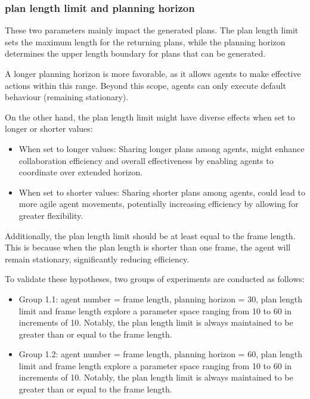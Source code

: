 \subsubsection{plan length limit and planning horizon}

These two parameters mainly impact the generated plans. The plan length limit sets the maximum length for the returning plans, while the planning horizon determines the upper length boundary for plans that can be generated.

A longer planning horizon is more favorable, as it allows agents to make effective actions within this range. Beyond this scope, agents can only execute default behaviour (remaining stationary).

On the other hand, the plan length limit might have diverse effects when set to longer or shorter values:
\begin{itemize}
    \item When set to longer values: Sharing longer plans among agents, might enhance collaboration efficiency and overall effectiveness by enabling agents to coordinate over extended horizon.
    \item When set to shorter values: Sharing shorter plans among agents, could lead to more agile agent movements, potentially increasing efficiency by allowing for greater flexibility.
\end{itemize}

Additionally, the plan length limit should be at least equal to the frame length. This is because when the plan length is shorter than one frame, the agent will remain stationary, significantly reducing efficiency.

To validate these hypotheses, two groups of experiments are conducted as follows:
\begin{itemize}
    \item Group 1.1: agent number = frame length, planning horizon = 30, plan length limit and frame length explore a parameter space ranging from 10 to 60 in increments of 10. Notably, the plan length limit is always maintained to be greater than or equal to the frame length.
    \item Group 1.2: agent number = frame length, planning horizon = 60, plan length limit and frame length explore a parameter space ranging from 10 to 60 in increments of 10. Notably, the plan length limit is always maintained to be greater than or equal to the frame length.
\end{itemize}

